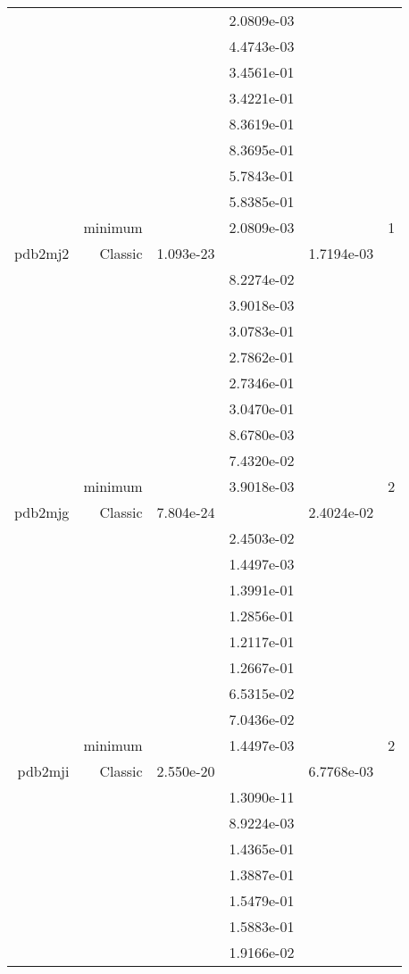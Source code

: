 \begin{xltabular}{\textwidth}{r|rS[table-format=1.3e+2]S[table-format=1.4e+2]S[table-format=1.4e+2]S[table-format=-1.5]}
&  &  & 2.0809e-03 & & \\
&  &  & 4.4743e-03 & & \\
&  &  & 3.4561e-01 & & \\
&  &  & 3.4221e-01 & & \\
&  &  & 8.3619e-01 & & \\
&  &  & 8.3695e-01 & & \\
&  &  & 5.7843e-01 & & \\
&  &  & 5.8385e-01 & & \\
& minimum &  & 2.0809e-03 & & 1 \\  \addlinespace
pdb2mj2 & Classic & 1.093e-23 &  & 1.7194e-03 & \\
&  &  & 8.2274e-02 & & \\
&  &  & 3.9018e-03 & & \\
&  &  & 3.0783e-01 & & \\
&  &  & 2.7862e-01 & & \\
&  &  & 2.7346e-01 & & \\
&  &  & 3.0470e-01 & & \\
&  &  & 8.6780e-03 & & \\
&  &  & 7.4320e-02 & & \\
& minimum &  & 3.9018e-03 & & 2 \\  \addlinespace
pdb2mjg & Classic & 7.804e-24 &  & 2.4024e-02 & \\
&  &  & 2.4503e-02 & & \\
&  &  & 1.4497e-03 & & \\
&  &  & 1.3991e-01 & & \\
&  &  & 1.2856e-01 & & \\
&  &  & 1.2117e-01 & & \\
&  &  & 1.2667e-01 & & \\
&  &  & 6.5315e-02 & & \\
&  &  & 7.0436e-02 & & \\
& minimum &  & 1.4497e-03 & & 2 \\  \addlinespace
pdb2mji & Classic & 2.550e-20 &  & 6.7768e-03 & \\
&  &  & 1.3090e-11 & & \\
&  &  & 8.9224e-03 & & \\
&  &  & 1.4365e-01 & & \\
&  &  & 1.3887e-01 & & \\
&  &  & 1.5479e-01 & & \\
&  &  & 1.5883e-01 & & \\
&  &  & 1.9166e-02 & & \\

\end{xltabular}
